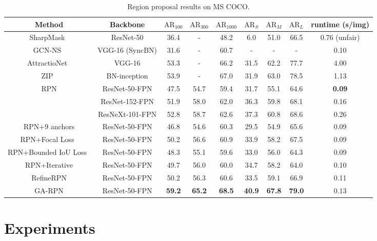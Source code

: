 \documentclass[10pt,twocolumn,letterpaper]{article}
\begin{document}
\begin{table*}[!ht]
	\centering
	\caption{\small{Region proposal results on MS COCO.}}
	\small{
	\begin{tabular}{*{9}{c}}
		\toprule
		Method & Backbone & $\text{AR}_{100}$ & $\text{AR}_{300}$ & $\text{AR}_{1000}$ & $\text{AR}_{S}$ & $\text{AR}_{M}$ & $\text{AR}_{L}$ & runtime (s/img) \\
		\midrule
		SharpMask~\cite{SharpMask} & ResNet-50 & 36.4 & -   & 48.2 & 6.0  & 51.0 & 66.5 & 0.76 (unfair) \\
		GCN-NS~\cite{lu2018toward} & VGG-16 (SyncBN) & 31.6 & - & 60.7 & - & - & - & 0.10 \\
		AttractioNet~\cite{gidaris2016attendbmvc} & VGG-16 & 53.3 & -    & 66.2 & 31.5 & 62.2 & 77.7 & 4.00 \\
		ZIP~\cite{li2017zoom} & BN-inception & 53.9    & -    & 67.0    & 31.9 & 63.0 & 78.5 & 1.13 \\
		\midrule
		\multirow{3}{*}{RPN} & ResNet-50-FPN & 47.5 & 54.7 & 59.4 & 31.7 & 55.1 & 64.6 & \textbf{0.09} \\
		& ResNet-152-FPN & 51.9 & 58.0 & 62.0 & 36.3 & 59.8 & 68.1 & 0.16 \\
		& ResNeXt-101-FPN & 52.8 & 58.7 & 62.6 & 37.3 & 60.8 & 68.6 & 0.26 \\
		\midrule
		RPN+9 anchors & ResNet-50-FPN & 46.8 & 54.6 & 60.3 & 29.5 & 54.9 & 65.6 & 0.09 \\
		RPN+Focal Loss~\cite{lin2017focal} & ResNet-50-FPN & 50.2 & 56.6 & 60.9 & 33.9 & 58.2 & 67.5 & 0.09 \\
		RPN+Bounded IoU Loss~\cite{tychsen2018improving}  & ResNet-50-FPN & 48.3 & 55.1 & 59.6 & 33.0 & 56.0 & 64.3 & 0.09 \\
		RPN+Iterative & ResNet-50-FPN & 49.7 & 56.0 & 60.0 & 34.7 & 58.2 & 64.0 & 0.10 \\
		RefineRPN     & ResNet-50-FPN & 50.2 & 56.3 & 60.6 & 33.5 & 59.1 & 66.9 & 0.11 \\
		\midrule
		GA-RPN & ResNet-50-FPN & \textbf{59.2} & \textbf{65.2} & \textbf{68.5} & \textbf{40.9} & \textbf{67.8} & \textbf{79.0} & 0.13 \\
		\bottomrule
	\end{tabular}
	}
	\vspace{-10pt}
	\label{tab:rpn-results-coco}
\end{table*}

\section{Experiments}
\label{sec:experiments}
\end{document}
